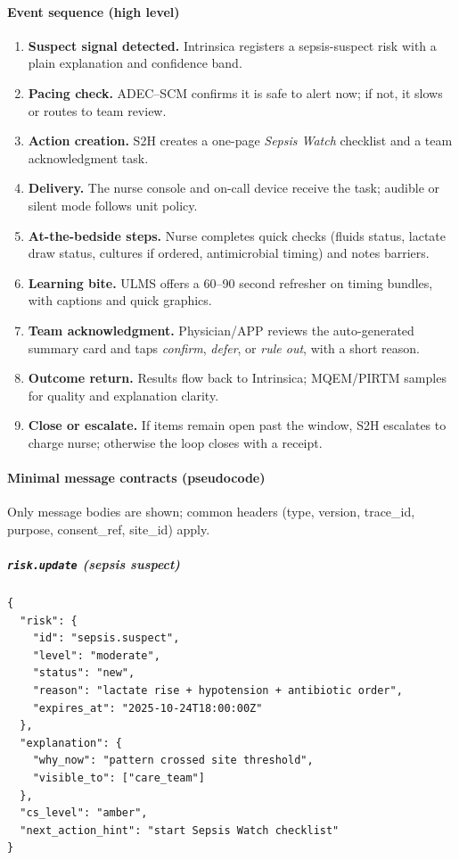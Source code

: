 \documentclass[12pt]{article}
\begin{document}
\paragraph{Event sequence (high level)}
\begin{enumerate}[leftmargin=*]
  \item \textbf{Suspect signal detected.} Intrinsica registers a sepsis-suspect risk with a plain explanation and confidence band.
  \item \textbf{Pacing check.} ADEC–SCM confirms it is safe to alert now; if not, it slows or routes to team review.
  \item \textbf{Action creation.} S2H creates a one-page \emph{Sepsis Watch} checklist and a team acknowledgment task.
  \item \textbf{Delivery.} The nurse console and on-call device receive the task; audible or silent mode follows unit policy.
  \item \textbf{At-the-bedside steps.} Nurse completes quick checks (fluids status, lactate draw status, cultures if ordered, antimicrobial timing) and notes barriers.
  \item \textbf{Learning bite.} ULMS offers a 60–90 second refresher on timing bundles, with captions and quick graphics.
  \item \textbf{Team acknowledgment.} Physician/APP reviews the auto-generated summary card and taps \emph{confirm}, \emph{defer}, or \emph{rule out}, with a short reason.
  \item \textbf{Outcome return.} Results flow back to Intrinsica; MQEM/PIRTM samples for quality and explanation clarity.
  \item \textbf{Close or escalate.} If items remain open past the window, S2H escalates to charge nurse; otherwise the loop closes with a receipt.
\end{enumerate}

\paragraph{Minimal message contracts (pseudocode)}
Only message bodies are shown; common headers (type, version, trace\_id, purpose, consent\_ref, site\_id) apply.

\subparagraph{\texttt{risk.update} (sepsis suspect)}
\begin{verbatim}
{
  "risk": {
    "id": "sepsis.suspect",
    "level": "moderate",
    "status": "new",
    "reason": "lactate rise + hypotension + antibiotic order",
    "expires_at": "2025-10-24T18:00:00Z"
  },
  "explanation": {
    "why_now": "pattern crossed site threshold",
    "visible_to": ["care_team"]
  },
  "cs_level": "amber",
  "next_action_hint": "start Sepsis Watch checklist"
}
\end{verbatim}
\end{document}
